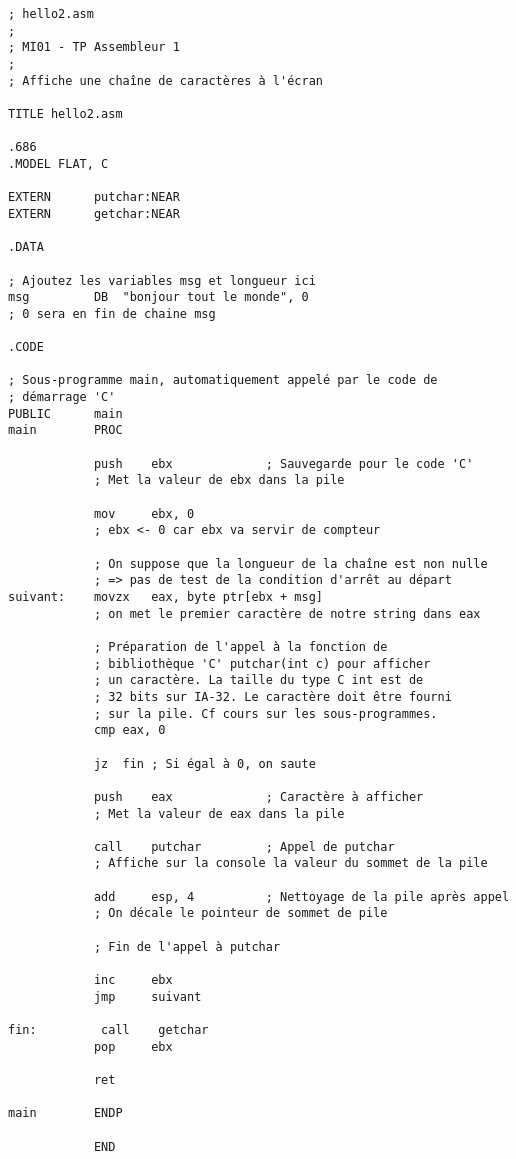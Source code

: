 \begin{lstlisting}[language={[x86masm]Assembler}]
; hello2.asm
;
; MI01 - TP Assembleur 1
;
; Affiche une chaîne de caractères à l'écran

TITLE hello2.asm

.686
.MODEL FLAT, C

EXTERN      putchar:NEAR
EXTERN      getchar:NEAR

.DATA

; Ajoutez les variables msg et longueur ici
msg			DB	"bonjour tout le monde", 0
; 0 sera en fin de chaine msg

.CODE

; Sous-programme main, automatiquement appelé par le code de
; démarrage 'C'
PUBLIC      main
main        PROC

            push    ebx             ; Sauvegarde pour le code 'C'
			; Met la valeur de ebx dans la pile
			
            mov     ebx, 0
            ; ebx <- 0 car ebx va servir de compteur

            ; On suppose que la longueur de la chaîne est non nulle
            ; => pas de test de la condition d'arrêt au départ
suivant:    movzx   eax, byte ptr[ebx + msg]
			; on met le premier caractère de notre string dans eax

            ; Préparation de l'appel à la fonction de
            ; bibliothèque 'C' putchar(int c) pour afficher
            ; un caractère. La taille du type C int est de
            ; 32 bits sur IA-32. Le caractère doit être fourni
            ; sur la pile. Cf cours sur les sous-programmes.
            cmp	eax, 0
            
            jz	fin ; Si égal à 0, on saute
            
            push    eax             ; Caractère à afficher
            ; Met la valeur de eax dans la pile
            
            call    putchar         ; Appel de putchar
            ; Affiche sur la console la valeur du sommet de la pile
            
            add     esp, 4          ; Nettoyage de la pile après appel
            ; On décale le pointeur de sommet de pile
            
            ; Fin de l'appel à putchar

            inc     ebx
            jmp     suivant

fin:         call    getchar
            pop     ebx

            ret

main        ENDP

            END
\end{lstlisting}

